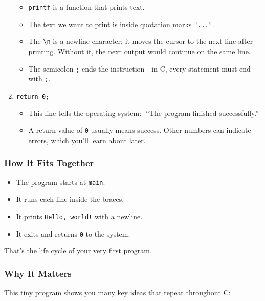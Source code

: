 \documentclass[
  letterpaper,
  DIV=11,
  numbers=noendperiod]{scrreprt}
\providecommand{\tightlist}{%
  \setlength{\itemsep}{0pt}\setlength{\parskip}{0pt}}
\begin{document}
\begin{enumerate}
  \begin{itemize}
  \tightlist
  \item
    \texttt{printf} is a function that prints text.
  \item
    The text we want to print is inside quotation marks \texttt{"..."}.
  \item
    The \texttt{\textbackslash{}n} is a newline character: it moves the
    cursor to the next line after printing. Without it, the next output
    would continue on the same line.
  \item
    The semicolon \texttt{;} ends the instruction - in C, every
    statement must end with \texttt{;}.
  \end{itemize}
\item
  \texttt{return\ 0;}

  \begin{itemize}
  \tightlist
  \item
    This line tells the operating system: -``The program finished
    successfully.''-
  \item
    A return value of \texttt{0} usually means success. Other numbers
    can indicate errors, which you'll learn about later.
  \end{itemize}
\end{enumerate}

\subsubsection{How It Fits Together}\label{how-it-fits-together}

\begin{itemize}
\tightlist
\item
  The program starts at \texttt{main}.
\item
  It runs each line inside the braces.
\item
  It prints \texttt{Hello,\ world!} with a newline.
\item
  It exits and returns \texttt{0} to the system.
\end{itemize}

That's the life cycle of your very first program.

\subsubsection{Why It Matters}\label{why-it-matters-1}

This tiny program shows you many key ideas that repeat throughout C:
\end{document}
